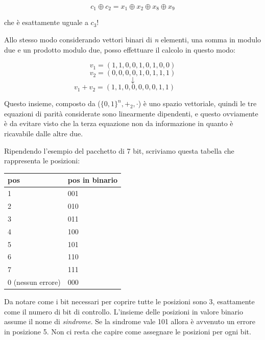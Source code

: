 \begin{equation*}
c_1 \oplus c_2 = x_1 \oplus x_2 \oplus x_8 \oplus x_9
\end{equation*}

che è esattamente uguale a $c_3$!

Allo stesso modo considerando vettori binari di \textit{n} elementi, una somma in modulo due e un prodotto modulo due, posso effettuare il calcolo in questo modo:

\begin{equation}
v_1 = (1,1,0,0,1,0,1,0,0)
\end{equation}
\begin{equation*}
v_2 = (0,0,0,0,1,0,1,1,1)
\end{equation*}
\begin{equation*}
\downarrow
\end{equation*}
\begin{equation*}
v_1 + v_2 = (1,1,0,0,0,0,0,1,1) \; \; \; \; \; \; \; \, \,
\end{equation*}


Questo insieme, composto da ($\{0,1\}^n, +_2, \cdot$) è uno spazio vettoriale, quindi le tre equazioni di parità considerate sono linearmente dipendenti, e questo ovviamente è da evitare visto che la terza equazione non da informazione in quanto è ricavabile dalle altre due.

\newpage 

Ripendendo l'esempio del pacchetto di 7 bit, scriviamo questa tabella che rappresenta le posizioni:

\begin{table}[h]
	\centering
	\begin{tabular}{l|l}
		pos & pos in binario \\
		\hline
		1   & 001            \\
		2   & 010            \\
		3   & 011            \\
		4   & 100            \\
		5   & 101            \\
		6   & 110            \\
		7   & 111        \\
		0 (nessun errore) & 000    
	\end{tabular}
\end{table}

Da notare come i bit necessari per coprire tutte le posizioni sono 3, esattamente come il numero di bit di controllo.
L'insieme delle posizioni in valore binario assume il nome di \textit{sindrome}.
Se la sindrome vale 101 allora è avvenuto un errore in posizione 5.
Non ci resta che capire come assegnare le posizioni per ogni bit.

